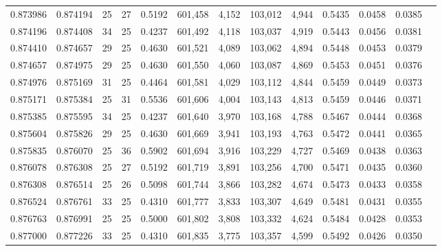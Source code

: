\begin{tabular}{rrrrrrrrrrrrr}
0.873986 & 0.874194 &    25 &  27 &                                     0.5192 & 601,458 &   4,152 & 103,012 &   4,944 & 0.5435 & 0.0458 & 0.0385 \\
0.874196 & 0.874408 &    34 &  25 &                                     0.4237 & 601,492 &   4,118 & 103,037 &   4,919 & 0.5443 & 0.0456 & 0.0381 \\
0.874410 & 0.874657 &    29 &  25 &                                     0.4630 & 601,521 &   4,089 & 103,062 &   4,894 & 0.5448 & 0.0453 & 0.0379 \\
0.874657 & 0.874975 &    29 &  25 &                                     0.4630 & 601,550 &   4,060 & 103,087 &   4,869 & 0.5453 & 0.0451 & 0.0376 \\
0.874976 & 0.875169 &    31 &  25 &                                     0.4464 & 601,581 &   4,029 & 103,112 &   4,844 & 0.5459 & 0.0449 & 0.0373 \\
0.875171 & 0.875384 &    25 &  31 &                                     0.5536 & 601,606 &   4,004 & 103,143 &   4,813 & 0.5459 & 0.0446 & 0.0371 \\
0.875385 & 0.875595 &    34 &  25 &                                     0.4237 & 601,640 &   3,970 & 103,168 &   4,788 & 0.5467 & 0.0444 & 0.0368 \\
0.875604 & 0.875826 &    29 &  25 &                                     0.4630 & 601,669 &   3,941 & 103,193 &   4,763 & 0.5472 & 0.0441 & 0.0365 \\
0.875835 & 0.876070 &    25 &  36 &                                     0.5902 & 601,694 &   3,916 & 103,229 &   4,727 & 0.5469 & 0.0438 & 0.0363 \\
0.876078 & 0.876308 &    25 &  27 &                                     0.5192 & 601,719 &   3,891 & 103,256 &   4,700 & 0.5471 & 0.0435 & 0.0360 \\
0.876308 & 0.876514 &    25 &  26 &                                     0.5098 & 601,744 &   3,866 & 103,282 &   4,674 & 0.5473 & 0.0433 & 0.0358 \\
0.876524 & 0.876761 &    33 &  25 &                                     0.4310 & 601,777 &   3,833 & 103,307 &   4,649 & 0.5481 & 0.0431 & 0.0355 \\
0.876763 & 0.876991 &    25 &  25 &                                     0.5000 & 601,802 &   3,808 & 103,332 &   4,624 & 0.5484 & 0.0428 & 0.0353 \\
0.877000 & 0.877226 &    33 &  25 &                                     0.4310 & 601,835 &   3,775 & 103,357 &   4,599 & 0.5492 & 0.0426 & 0.0350 \\

\end{tabular}
